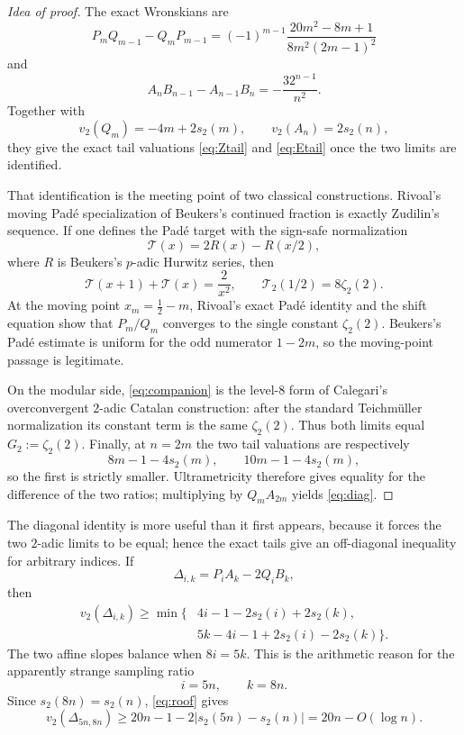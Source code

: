 \documentclass[11pt]{article}
\newcommand{\vTwo}{v_2}
\begin{document}
\begin{proof}[Idea of proof]
The exact Wronskians are
\[
 P_mQ_{m-1}-Q_mP_{m-1}
 =(-1)^{m-1}\frac{20m^2-8m+1}{8m^2(2m-1)^2}
\]
and
\[
 A_nB_{n-1}-A_{n-1}B_n=-\frac{32^{n-1}}{n^2}.
\]
Together with
\[
 \vTwo(Q_m)=-4m+2s_2(m),
 \qquad
 \vTwo(A_n)=2s_2(n),
\]
they give the exact tail valuations \eqref{eq:Ztail} and \eqref{eq:Etail}
once the two limits are identified.

That identification is the meeting point of two classical constructions.
Rivoal's moving Pad\'e specialization of Beukers's continued fraction is
exactly Zudilin's sequence.  If one defines the Pad\'e target with the
sign-safe normalization
\[
 \mathcal T(x)=2R(x)-R(x/2),
\]
where $R$ is Beukers's $p$-adic Hurwitz series, then
\[
 \mathcal T(x+1)+\mathcal T(x)=\frac{2}{x^2},
 \qquad
 \mathcal T_2(1/2)=8\zeta_2(2).
\]
At the moving point $x_m=\tfrac12-m$, Rivoal's exact Pad\'e identity and the
shift equation show that $P_m/Q_m$ converges to the single constant
$\zeta_2(2)$.  Beukers's Pad\'e estimate is uniform for the odd numerator
$1-2m$, so the moving-point passage is legitimate.

On the modular side, \eqref{eq:companion} is the level-$8$ form of Calegari's
overconvergent $2$-adic Catalan construction: after the standard
Teichm\"uller normalization its constant term is the same $\zeta_2(2)$.
Thus both limits equal $G_2:=\zeta_2(2)$.  Finally, at $n=2m$ the two tail
valuations are respectively
\[
 8m-1-4s_2(m),\qquad10m-1-4s_2(m),
\]
so the first is strictly smaller.  Ultrametricity therefore gives equality
for the difference of the two ratios; multiplying by $Q_mA_{2m}$ yields
\eqref{eq:diag}.
\end{proof}

The diagonal identity is more useful than it first appears, because it forces
the two $2$-adic limits to be equal; hence the exact tails give an
off-diagonal inequality for arbitrary indices.  If
\[
 \Delta_{i,k}=P_iA_k-2Q_iB_k,
\]
then
\begin{equation}\label{eq:roof}
\begin{split}
 \vTwo(\Delta_{i,k})\ge\min\{&
 4i-1-2s_2(i)+2s_2(k),\\
 &5k-4i-1+2s_2(i)-2s_2(k)\}.
\end{split}
\end{equation}
The two affine slopes balance when $8i=5k$.  This is the arithmetic reason
for the apparently strange sampling ratio
\[
 \boxed{i=5n,\qquad k=8n.}
\]
Since $s_2(8n)=s_2(n)$, \eqref{eq:roof} gives
\begin{equation}\label{eq:58delta}
 \vTwo(\Delta_{5n,8n})
 \ge20n-1-2|s_2(5n)-s_2(n)|
 =20n-O(\log n).
\end{equation}
\end{document}
